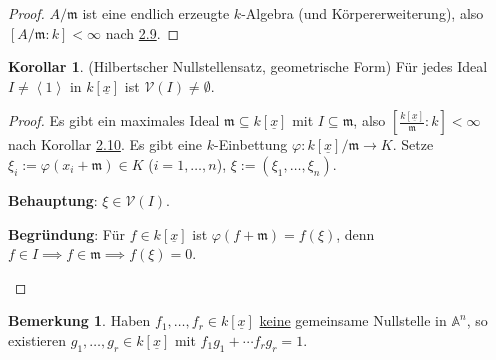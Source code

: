 \documentclass[
twoside=semi,
fontsize=12,
DIV=12, 
cleardoublepage=current,
leqno,
headings=optiontoheadandtoc, 
toc=idx
]{scrbook}
\newcommand{\A}{\mathbb{A}}
\newcommand{\V}{\mathcal{V}}
\newcommand{\x}{\underline{x}}
\newcommand{\bracC}[1]{\left< #1 \right>}
\newcommand{\emphasize}[1]{\underline{#1}}
\theoremstyle{definition}
\newtheorem{bemerkung}[definition]{Bemerkung}
\newtheorem{korollar}[definition]{Korollar}
\begin{document}
	\begin{proof}\hfill\newline
		$A/\mathfrak{m}$ ist eine endlich erzeugte $k$-Algebra (und K\"orpererweiterung), also $[A/\mathfrak{m}:k] < \infty$ nach \hyperref[1.2.9]{2.9}.
	\end{proof}

	\begin{korollar}\label{1.2.11}(Hilbertscher Nullstellensatz, geometrische Form)\newline
		F\"ur jedes Ideal $I \neq \bracC{1}$ in $k[\x]$ ist $\V(I) \neq \emptyset$.
	\end{korollar}

	\begin{proof}\hfill\newline
		Es gibt ein maximales Ideal $\mathfrak{m} \subseteq k[\x]$ mit $I \subseteq \mathfrak{m}$, also $[\frac{k[\x]}{\mathfrak{m}}:k] < \infty$ nach Korollar \hyperref[1.2.10]{2.10}.
		Es gibt eine $k$-Einbettung $\varphi: k[\x]/\mathfrak{m} \to K$. Setze $\xi_i := \varphi(x_i+\mathfrak{m}) \in K$ ($i=1,\dots, n$), $\xi:= (\xi_1, \dots, \xi_n)$.
		\begin{tcolorbox}[colback=white,colframe=blue,arc=0cm]
			\textbf{Behauptung}: $\xi \in \V(I)$.
			
			\tcblower
			\textbf{Begr\"undung}: \newline
			F\"ur $f \in k[\x]$ ist $\varphi(f + \mathfrak{m}) = f(\xi)$, denn $f \in I \implies f \in \mathfrak{m} \implies f(\xi) = 0$.
		\end{tcolorbox}
	\end{proof}

	\begin{bemerkung}\label{1.2.12}\hfill\newline
		Haben $f_1, \dots, f_r \in k[\x]$ \emphasize{keine} gemeinsame Nullstelle in $\A^n$, so existieren $g_1, \dots, g_r \in k[\x]$ mit $f_1g_1+\cdots f_rg_r = 1$.
	\end{bemerkung}
\end{document}
